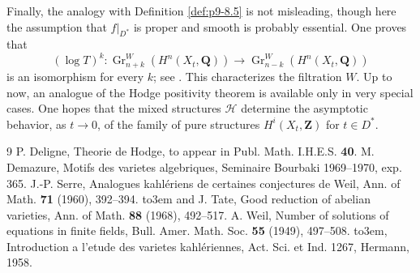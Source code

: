 \documentclass[11pt]{amsart}
\theoremstyle{plain}
\theoremstyle{definition}
\theoremstyle{remark}
\DeclareMathOperator{\Gr}{Gr}
\newcommand{\Q}{\mathbf{Q}}
\newcommand{\Z}{\mathbf{Z}}
\providecommand{\bysame}{\leavevmode\hbox to3em{\hrulefill}\thinspace}
\begin{document}
Finally, the analogy with Definition \ref{def:p9-8.5} is not misleading, though here the assumption that $f|_{D^*}$ is proper and smooth is probably essential. One proves that
\[
(\log T)^k:\Gr_{n+k}^W(H^n(X_t,\Q))\to \Gr_{n-k}^W(H^n(X_t,\Q))
\]
is an isomorphism for every $k$; see \cite[IV, 6, corollary to Theorem 5]{Weyl}. This characterizes the filtration $W$. Up to now, an analogue of the Hodge positivity theorem \cite[IV, 7, corollary to Theorem 7]{Weyl} is available only in very special cases. One hopes that the mixed structures $\mathscr H$ determine the asymptotic behavior, as $t\to0$, of the family of pure structures $H^i(X_t,\Z)$ for $t\in D^*$.

\begin{thebibliography}{9}
 P. Deligne, Theorie de Hodge, to appear in Publ. Math. I.H.E.S. \textbf{40}.
 M. Demazure, Motifs des varietes algebriques, Seminaire Bourbaki 1969--1970, exp. 365.
 J.-P. Serre, Analogues kahl\'eriens de certaines conjectures de Weil, Ann. of Math. \textbf{71} (1960), 392--394.
 \bysame{} and J. Tate, Good reduction of abelian varieties, Ann. of Math. \textbf{88} (1968), 492--517.
 A. Weil, Number of solutions of equations in finite fields, Bull. Amer. Math. Soc. \textbf{55} (1949), 497--508.
 \bysame, Introduction a l'etude des varietes kahl\'eriennes, Act. Sci. et Ind. 1267, Hermann, 1958.
\end{thebibliography}
\end{document}

